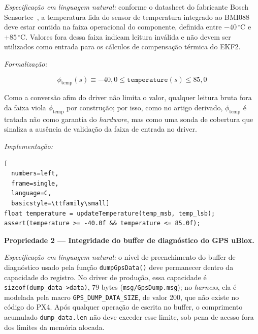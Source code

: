 \textit{Especificação em linguagem natural:} conforme o datasheet do fabricante Bosch Sensortec~\cite{Bosch2021}, a temperatura lida do sensor de temperatura integrado ao BMI088 deve estar contida na faixa operacional do componente, definida entre $-40\,^{\circ}$C e $+85\,^{\circ}$C. Valores fora dessa faixa indicam leitura inválida e não devem ser utilizados como entrada para os cálculos de compensação térmica do EKF2.

\textit{Formalização:}

\begin{equation}
\phi_{\text{temp}}(s) \equiv -40{,}0 \leq \texttt{temperature}(s) \leq 85{,}0
\label{eq:prop_temp}
\end{equation}

 Como a conversão afim do driver não
limita o valor, qualquer leitura bruta fora da faixa viola $\phi_{\text{temp}}$
por construção; por isso, como no artigo derivado, $\phi_{\text{temp}}$ é tratada
não como garantia do \textit{hardware}, mas como uma sonda de cobertura que
sinaliza a ausência de validação da faixa de entrada no driver.

\textit{Implementação:}

\begin{lstlisting}[
  numbers=left,
  frame=single,
  language=C,
  basicstyle=\ttfamily\small]
float temperature = updateTemperature(temp_msb, temp_lsb);
assert(temperature >= -40.0f && temperature <= 85.0f);
\end{lstlisting}

\textbf{Propriedade 2 --- Integridade do buffer de diagnóstico do GPS uBlox.}

\textit{Especificação em linguagem natural:} o nível de preenchimento do buffer de diagnóstico usado pela função \texttt{dumpGpsData()} deve permanecer dentro da capacidade do registro. No driver de produção, essa capacidade é \texttt{sizeof(dump\_data->data)}, 79 bytes (\texttt{msg/GpsDump.msg}); no \textit{harness}, ela é modelada pela macro \texttt{GPS\_DUMP\_DATA\_SIZE}, de valor 200, que não existe no código do PX4. Após qualquer operação de escrita no buffer, o comprimento acumulado \texttt{dump\_data.len} não deve exceder esse limite, sob pena de acesso fora dos limites da memória alocada.

